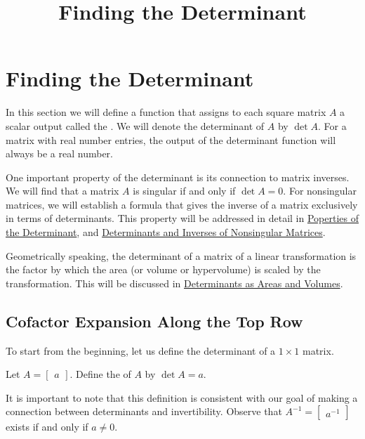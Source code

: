 \documentclass{ximera}
\title{Finding the Determinant} \license{CC BY-NC-SA 4.0}
\begin{document}
\begin{abstract}

\end{abstract}
\maketitle

\section*{Finding the Determinant}
In this section we will define a function that assigns to each square matrix $A$ a scalar output called the .  We will denote the determinant of $A$ by $\det{A}$.  For a matrix with real number entries, the output of the determinant function will always be a real number.

One important property of the determinant is its connection to matrix inverses.  We will find that a matrix $A$ is singular if and only if $\det{A}=0$.  For nonsingular matrices, we will establish a formula that gives the inverse of a matrix exclusively in terms of determinants.  This property will be addressed in detail in \href{https://ximera.osu.edu/oerlinalg/LinearAlgebra/DET-0040/main}{Poperties of the Determinant}, and \href{https://ximera.osu.edu/oerlinalg/LinearAlgebra/DET-0060/main}{Determinants and Inverses of Nonsingular Matrices}.

Geometrically speaking, the determinant of a matrix of a linear transformation is the factor by which the area (or volume or hypervolume) is scaled by the transformation.  This will be discussed in \href{https://ximera.osu.edu/oerlinalg/LinearAlgebra/DET-0070/main}{Determinants as Areas and Volumes}. 

\subsection*{Cofactor Expansion Along the Top Row}
To start from the beginning, let us define the determinant of a $1\times 1$ matrix.
\begin{definition}\label{def:onebyonedet} Let
$A=\begin{bmatrix}a\end{bmatrix}$.  Define the  of $A$ by $\det{A}=a$.
\end{definition}
It is important to note that this definition is consistent with our goal of making a connection between determinants and invertibility.  Observe that $A^{-1}=\begin{bmatrix}a^{-1}\end{bmatrix}$ exists if and only if $a\neq 0$.
\end{document}

